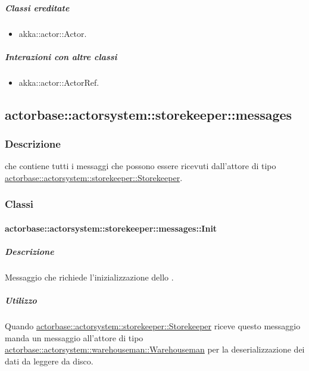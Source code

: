 \documentclass{scalatekids-article}
\begin{document}
\subparagraph{Classi ereditate}

\begin{itemize}

\item akka::actor::Actor.

\end{itemize}

\subparagraph{Interazioni con altre classi}

\begin{itemize}
\item akka::actor::ActorRef.
\end{itemize}

\subsection{actorbase::actorsystem::storekeeper::messages}
\label{sec:actorbase::actorsystem::storekeeper::messages}

\subsubsection{Descrizione}

 che contiene tutti i messaggi che possono essere
ricevuti dall'attore di tipo
\hyperref[sec:actorbase::actorsystem::storekeeper::Storekeeper]{actorbase::\allowbreak{}actorsystem::\allowbreak{}storekeeper::\allowbreak{}Storekeeper}.

\subsubsection{Classi}

\paragraph{actorbase::actorsystem::storekeeper::messages::Init}
\label{sec:actorbase::actorsystem::storekeeper::messages::Init}

\subparagraph{Descrizione}

Messaggio che richiede l'inizializzazione dello .

\subparagraph{Utilizzo}

Quando \hyperref[sec:actorbase::actorsystem::storekeeper::Storekeeper]{actorbase::actorsystem::storekeeper::Storekeeper}
riceve questo messaggio manda un messaggio all'attore di tipo
\hyperref[sec:actorbase::actorsystem::warehouseman::Warehouseman]{actorbase::\allowbreak{}actorsystem::\allowbreak{}warehouseman::\allowbreak{}Warehouseman}
per la deserializzazione dei dati da leggere da disco.
\end{document}
